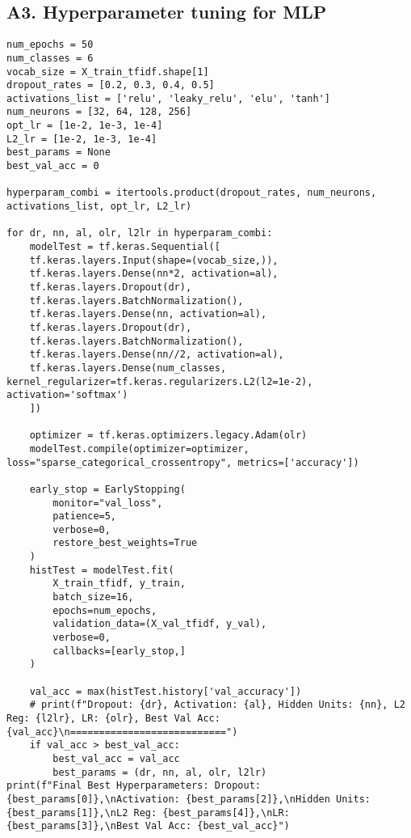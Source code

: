 \subsection*{A3. Hyperparameter tuning for MLP}\label{subsec:appendix3}
\begin{lstlisting}[frame=single]
num_epochs = 50
num_classes = 6
vocab_size = X_train_tfidf.shape[1]
dropout_rates = [0.2, 0.3, 0.4, 0.5]
activations_list = ['relu', 'leaky_relu', 'elu', 'tanh']
num_neurons = [32, 64, 128, 256]
opt_lr = [1e-2, 1e-3, 1e-4]
L2_lr = [1e-2, 1e-3, 1e-4]
best_params = None
best_val_acc = 0

hyperparam_combi = itertools.product(dropout_rates, num_neurons, activations_list, opt_lr, L2_lr)

for dr, nn, al, olr, l2lr in hyperparam_combi:
    modelTest = tf.keras.Sequential([
    tf.keras.layers.Input(shape=(vocab_size,)),
    tf.keras.layers.Dense(nn*2, activation=al),
    tf.keras.layers.Dropout(dr),
    tf.keras.layers.BatchNormalization(),
    tf.keras.layers.Dense(nn, activation=al),
    tf.keras.layers.Dropout(dr),
    tf.keras.layers.BatchNormalization(),
    tf.keras.layers.Dense(nn//2, activation=al),
    tf.keras.layers.Dense(num_classes, kernel_regularizer=tf.keras.regularizers.L2(l2=1e-2), activation='softmax')
    ])

    optimizer = tf.keras.optimizers.legacy.Adam(olr)
    modelTest.compile(optimizer=optimizer, loss="sparse_categorical_crossentropy", metrics=['accuracy'])
    
    early_stop = EarlyStopping(
        monitor="val_loss",
        patience=5,
        verbose=0,
        restore_best_weights=True
    )
    histTest = modelTest.fit(
        X_train_tfidf, y_train,
        batch_size=16,
        epochs=num_epochs,
        validation_data=(X_val_tfidf, y_val),
        verbose=0,
        callbacks=[early_stop,]
    )

    val_acc = max(histTest.history['val_accuracy'])
    # print(f"Dropout: {dr}, Activation: {al}, Hidden Units: {nn}, L2 Reg: {l2lr}, LR: {olr}, Best Val Acc: {val_acc}\n===========================")
    if val_acc > best_val_acc:
        best_val_acc = val_acc
        best_params = (dr, nn, al, olr, l2lr)
print(f"Final Best Hyperparameters: Dropout: {best_params[0]},\nActivation: {best_params[2]},\nHidden Units: {best_params[1]},\nL2 Reg: {best_params[4]},\nLR: {best_params[3]},\nBest Val Acc: {best_val_acc}")    
\end{lstlisting}